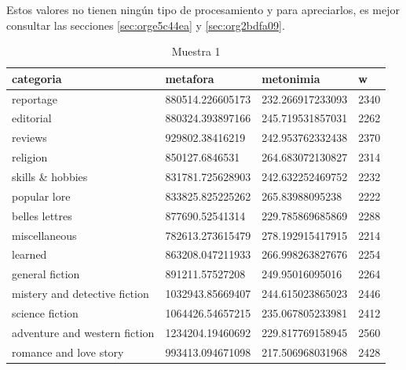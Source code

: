 \documentclass[12pt,letterpaper,twoside]{article}
\begin{document}
Estos valores no tienen ningún tipo de procesamiento y para apreciarlos, es mejor
consultar las secciones \ref{sec:orge5c44ea} y \ref{sec:org2bdfa09}.

\small
\begin{center}
    \begin{longtable}{| p{} | p{} | p{}|p{}|}
    \caption{Muestra 1}
    \hline
        categoria & metafora & metonimia & w \\ \hline
        reportage & 880514.226605173 & 232.266917233093 & 2340 \\ \hline
        editorial & 880324.393897166 & 245.719531857031 & 2262 \\ \hline
        reviews & 929802.38416219 & 242.953762332438 & 2370 \\ \hline
        religion & 850127.6846531 & 264.683072130827 & 2314 \\ \hline
        skills \& hobbies & 831781.725628903 & 242.632252469752 & 2232 \\ \hline
        popular lore & 833825.825225262 & 265.83988095238 & 2222 \\ \hline
        belles lettres & 877690.52541314 & 229.785869685869 & 2288 \\ \hline
        miscellaneous & 782613.273615479 & 278.192915417915 & 2214 \\ \hline
        learned & 863208.047211933 & 266.998263827676 & 2254 \\ \hline
        general fiction & 891211.57527208 & 249.95016095016 & 2264 \\ \hline
        mistery and detective fiction & 1032943.85669407 & 244.615023865023 & 2446 \\ \hline
        science fiction & 1064426.54657215 & 235.067805233981 & 2412 \\ \hline
        adventure and western fiction & 1234204.19460692 & 229.817769158945 & 2560 \\ \hline
        romance and love story & 993413.094671098 & 217.506968031968 & 2428 \\ \hline
\end{longtable}
\label{muestra1}
\end{center}
\end{document}
